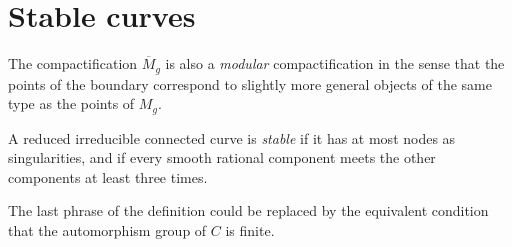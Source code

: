 %
%
%
%
%

\section{Stable curves}

The compactification $\overline M_g$ is also a \emph{modular}  compactification in the sense that the points of the boundary correspond to slightly more general
objects of the same type as the points of $M_g$. 
\begin{definition}
A reduced irreducible connected curve is \emph{stable} if it has at most nodes as singularities,  and if every smooth rational component meets the other components at least three times.

The last phrase of the definition could be replaced by the equivalent condition that the automorphism group
of $C$ is finite. 
\end{definition}

